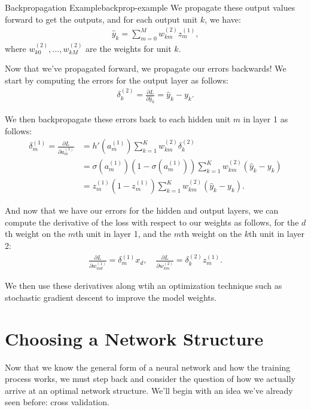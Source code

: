 \begin{example}{Backpropagation Example}{backprop-example}
	We propagate these output values  forward to get the outputs, and for each output unit $k$, we have:
	\begin{align*}
		\hat{y}_{k} = \sum_{m=0}^{M} w_{km}^{(2)} z^{(1)}_{m},
	\end{align*}
where $w^{(2)}_{k0},\ldots,w^{(2)}_{kM}$ are the weights for unit $k$.
        
	Now that we've propagated forward, we propagate our errors backwards! We start by computing the errors for the output layer as follows:
	\begin{align*}
		\delta^{(2)}_{k} =  \frac{\partial L}{\partial \hat{y}_k}=\hat{y}_{k} - y_{k}.
	\end{align*}

	We then backpropagate these errors back to each hidden unit $m$ in layer 1 as follows:
	\begin{align*}
          \delta^{(1)}_{m} = \frac{\partial L}{\partial a_m^{(1)}} & =
                                                                     h'(a_m^{(1)})\sum_{k=1}^Kw^{(2)}_{km}\delta^{(2)}_k\\
                                                                   &=\sigma(a^{(1)}_m)(1-\sigma(a^{(1)}_m))\sum_{k=1}^Kw^{(2)}_{km}(\hat{y}_k-y_k)\\
                                                                   &=z_m^{(1)}(1-z_m^{(1)}) \sum_{k=1}^Kw^{(2)}_{km}(\hat{y}_k-y_k).
                                                                     \end{align*}

	And now that we have our errors for the hidden and output layers, we can compute the derivative of the loss with respect to our weights as follows, for the $d$th weight on the $m$th unit in layer 1, and the $m$th weight on the $k$th unit in layer 2: 
	\begin{align*}
		\frac{\partial L}{\partial w_{md}^{(1)}} = \delta^{(1)}_{m} x_{d}, \quad \frac{\partial L}{\partial w^{(2)}_{km}} = \delta^{(2)}_{k} z^{(1)}_{m}.
	\end{align*}
        
	We then use these derivatives along wtih an optimization technique such as stochastic gradient descent to improve the model weights.
\end{example}

\section{Choosing a Network Structure}
Now that we know the general form of a neural network and how the training process works, we must step back and consider the question of how we actually arrive at an optimal network structure. We'll begin with an idea we've already seen before: cross validation.

